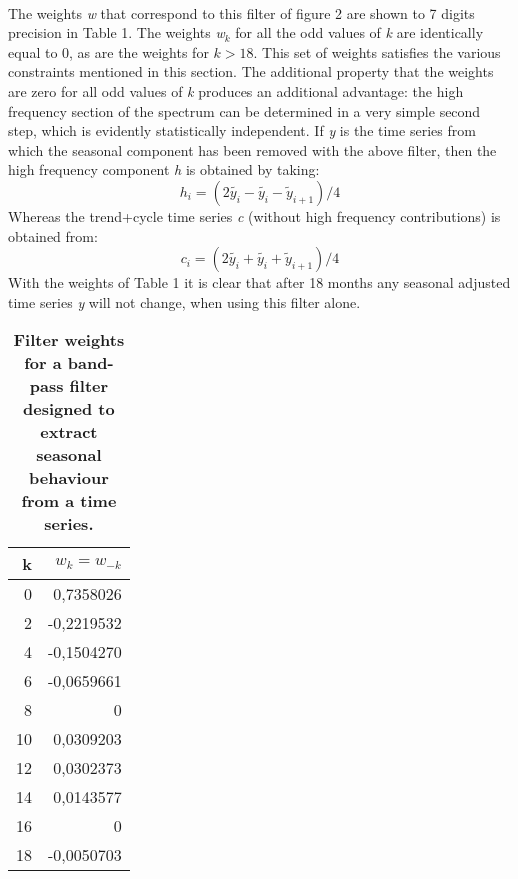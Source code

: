 \documentclass{article}
\begin{document}
\\The weights \textit{w} that correspond to this filter of figure 2 are shown to 7 digits precision in Table 1. The weights \textit{w$_k$} for all the odd values of \textit{k} are identically equal to 0, as are the weights for $ k>18$. This set of weights satisfies the various constraints mentioned in this section. The additional property that the weights are zero for all odd values of\textit{ k} produces an additional advantage: the high frequency section of the spectrum can be determined in a very simple second step, which is evidently statistically independent. If \textit{y} is the time series from which the seasonal component has been removed with the above filter, then the high frequency component \textit{h} is obtained by taking:
\begin{equation}
h_i = (2 \tilde{y_i} - \tilde{y_i} - \tilde{y}_{i+1})/4
\end{equation}
Whereas the trend+cycle time series \textit{c} (without high frequency contributions) is obtained from:
\begin{equation}
c_i = (2\tilde{y_i}+\tilde{y_i}+\tilde{y}_{i+1})/4
\end{equation}
With the weights of Table 1 it is clear that after 18 months any seasonal adjusted time series \textit{y} will not change, when using this filter alone.
\begin{table}[h!]
\centering
\caption{\textbf{\small Filter weights for a band-pass filter designed to extract seasonal behaviour from a time series.}}
\bigskip
\begin{tabular}{r r}
k & $w_k=w_{-k}$\\
\hline
0 & 0,7358026\\
2 & -0,2219532\\
4 & -0,1504270\\
6 & -0,0659661\\
8 & 0\\
10 & 0,0309203\\
12 & 0,0302373\\
14 & 0,0143577\\
16 & 0\\
18 & -0,0050703\\
\hline
\end{tabular}
\end{table}
\end{document}
